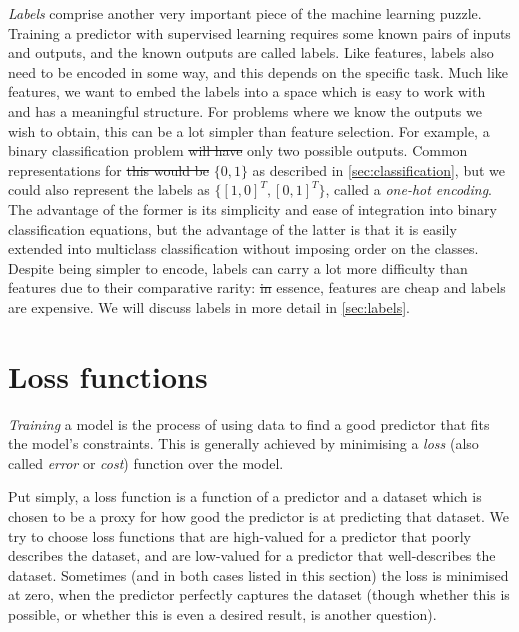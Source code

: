 \documentclass[11pt, a4paper]{book}
\newcommand{\defn}[1]{\emph{#1}}
\providecommand{\DIFaddtex}[1]{{\protect\color{blue}\uwave{#1}}} %
\providecommand{\DIFdeltex}[1]{{\protect\color{red}\sout{#1}}}                      %
\providecommand{\DIFaddbegin}{} %
\providecommand{\DIFaddend}{} %
\providecommand{\DIFdelbegin}{} %
\providecommand{\DIFdelend}{} %
\providecommand{\DIFadd}[1]{\texorpdfstring{\DIFaddtex{#1}}{#1}} %
\providecommand{\DIFdel}[1]{\texorpdfstring{\DIFdeltex{#1}}{}} %
\newcommand{\DIFscaledelfig}{0.5}
\newlength{\DIFdelgraphicswidth} %
\newlength{\DIFdelgraphicsheight} %
\newcommand{\DIFaddincludegraphics}[2][]{{\color{blue}\fbox{\DIFOincludegraphics[#1]{#2}}}} %
\newcommand{\DIFdelincludegraphics}[2][]{%
\sbox{\DIFdelgraphicsbox}{\DIFOincludegraphics[#1]{#2}}%
\settoboxwidth{\DIFdelgraphicswidth}{\DIFdelgraphicsbox} %
\settoboxtotalheight{\DIFdelgraphicsheight}{\DIFdelgraphicsbox} %
\scalebox{\DIFscaledelfig}{%
\parbox[b]{\DIFdelgraphicswidth}{\usebox{\DIFdelgraphicsbox}\\[-\baselineskip] \rule{\DIFdelgraphicswidth}{0em}}\llap{\resizebox{\DIFdelgraphicswidth}{\DIFdelgraphicsheight}{%
\setlength{\unitlength}{\DIFdelgraphicswidth}%
\begin{picture}(1,1)%
\thicklines\linethickness{2pt} %
{\color[rgb]{1,0,0}\put(0,0){\framebox(1,1){}}}%
{\color[rgb]{1,0,0}\put(0,0){\line( 1,1){1}}}%
{\color[rgb]{1,0,0}\put(0,1){\line(1,-1){1}}}%
\end{picture}%
}\hspace*{3pt}}} %
} %
\DeclareRobustCommand{\DIFaddbegin}{\DIFOaddbegin \let\includegraphics\DIFaddincludegraphics} %
\DeclareRobustCommand{\DIFaddend}{\DIFOaddend \let\includegraphics\DIFOincludegraphics} %
\DeclareRobustCommand{\DIFdelbegin}{\DIFOdelbegin \let\includegraphics\DIFdelincludegraphics} %
\DeclareRobustCommand{\DIFdelend}{\DIFOaddend \let\includegraphics\DIFOincludegraphics} %
\begin{document}
    \defn{Labels} comprise another very important piece of the machine learning puzzle. Training a predictor with supervised learning requires some known pairs of inputs and outputs, and the known outputs are called labels. Like features, labels also need to be encoded in some way, and this depends on the specific task. Much like features, we want to embed the labels into a space which is easy to work with and has a meaningful structure. For problems where we know the outputs we wish to obtain, this can be a lot simpler than feature selection. For example, a binary classification problem \DIFdelbegin \DIFdel{will have }\DIFdelend \DIFaddbegin \DIFadd{has }\DIFaddend only two possible outputs. Common representations for \DIFdelbegin \DIFdel{this would be }\DIFdelend \DIFaddbegin \DIFadd{these are }\DIFaddend $\{0, 1\}$ as described in \autoref{sec:classification}, but we could also represent the labels as $\{[1, 0]^T, [0, 1]^T\}$, called a \defn{one-hot encoding}. The advantage of the former is its simplicity and ease of integration into binary classification equations, but the advantage of the latter is that it is easily extended into multiclass classification without imposing order on the classes. Despite being simpler to encode, labels can carry a lot more difficulty than features due to their comparative rarity: \DIFdelbegin \DIFdel{in }\DIFdelend \DIFaddbegin \DIFadd{In }\DIFaddend essence, features are cheap and labels are expensive. We will discuss labels in more detail in \autoref{sec:labels}.

\section{Loss functions}
\label{sec:training}

    \defn{Training} a model is the process of using data to find a good predictor that fits the model's constraints. This is generally achieved by minimising a \defn{loss} (also called \defn{error} or \defn{cost}) function over the model.

    Put simply, a loss function is a function of a predictor and a dataset which is chosen to be a proxy for how good the predictor is at predicting that dataset. We try to choose loss functions that are high-valued for a predictor that poorly describes the dataset, and are low-valued for a predictor that well-describes the dataset. Sometimes (and in both cases listed in this section) the loss is minimised at zero, when the predictor perfectly captures the dataset (though whether this is possible, or whether this is even a desired result, is another question).
\end{document}
